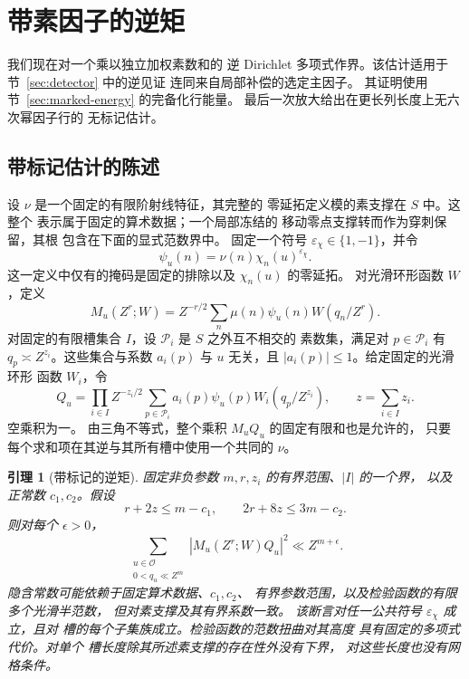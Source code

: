 \documentclass[11pt,a4paper]{article}
\numberwithin{equation}{section}
\numberwithin{figure}{section}
\newtheorem{lemma}[theorem]{引理}
\theoremstyle{definition}
\theoremstyle{remark}
\begin{document}
\section{带素因子的逆矩}\label{sec:inverse}

我们现在对一个乘以独立加权素数和的
逆 Dirichlet 多项式作界。该估计适用于节~\ref{sec:detector} 中的逆见证
连同来自局部补偿的选定主因子。
其证明使用节~\ref{sec:marked-energy} 的完备化行能量。
最后一次放大给出在更长列长度上无六次幂因子行的
无标记估计。

\subsection{带标记估计的陈述}

设 \(\nu\) 是一个固定的有限阶射线特征，其完整的
零延拓定义模的素支撑在 \(S\) 中。这整个
表示属于固定的算术数据；一个局部冻结的
移动零点支撑转而作为穿刺保留，其根
包含在下面的显式范数界中。
固定一个符号 \(\varepsilon_\chi\in\{1,-1\}\)，并令
\[
 \psi_u(n)=\nu(n)\chi_n(u)^{\varepsilon_\chi}.
\]
这一定义中仅有的掩码是固定的排除以及
\(\chi_n(u)\) 的零延拓。
对光滑环形函数 \(W\)，定义
\[
 M_u(Z^r;W)=Z^{-r/2}\sum_n\mu(n)\psi_u(n)W(q_n/Z^r).
\]
对固定的有限槽集合 \(I\)，设 \(\mathcal P_i\) 是 \(S\) 之外互不相交的
素数集，满足对
\(p\in\mathcal P_i\) 有 \(q_p\asymp Z^{z_i}\)。这些集合与系数 \(a_i(p)\)
与 \(u\) 无关，且 \(|a_i(p)|\le1\)。给定固定的光滑环形
函数 \(W_i\)，令
\[
 Q_u=\prod_{i\in I}Z^{-z_i/2}
       \sum_{p\in\mathcal P_i}a_i(p)\psi_u(p)W_i(q_p/Z^{z_i}),
 \qquad z=\sum_{i\in I}z_i.
\]
空乘积为一。
由三角不等式，整个乘积 \(M_uQ_u\) 的固定有限和也是允许的，
只要每个求和项在其逆与其所有槽中使用一个共同的
\(\nu\)。

\begin{lemma}[带标记的逆矩]\label{lem:marked}
固定非负参数 \(m,r,z_i\) 的有界范围、\(|I|\) 的一个界，
以及正常数 \(c_1,c_2\)。假设
\[
 r+2z\le m-c_1,\qquad 2r+8z\le3m-c_2.
\]
则对每个 \(\epsilon>0\)，
\begin{equation}\label{old-eq:4.1}
 \sum_{\substack{u\in\mathcal O\\0<q_u\ll Z^m}}
       |M_u(Z^r;W)Q_u|^2\ll Z^{m+\epsilon}.
\end{equation}
隐含常数可能依赖于固定算术数据、\(c_1,c_2\)、
有界参数范围，以及检验函数的有限多个光滑半范数，
但对素支撑及其有界系数一致。
该断言对任一公共符号 \(\varepsilon_\chi\) 成立，且对
槽的每个子集族成立。检验函数的范数扭曲对其高度
具有固定的多项式代价。对单个
槽长度除其所述素支撑的存在性外没有下界，
对这些长度也没有网格条件。
\end{lemma}
\end{document}
